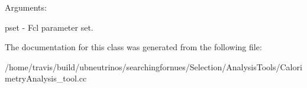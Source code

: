 Arguments\+:

pset -\/ Fcl parameter set. 

The documentation for this class was generated from the following file\+:\begin{DoxyCompactItemize}
\item 
/home/travis/build/ubneutrinos/searchingfornues/\+Selection/\+Analysis\+Tools/Calorimetry\+Analysis\+\_\+tool.\+cc\end{DoxyCompactItemize}
